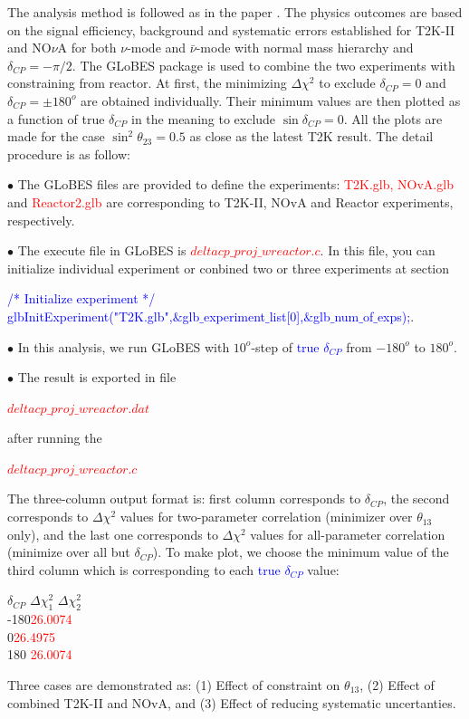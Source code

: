 \documentclass[a4 paper,12pt]{report}%
\begin{document}
The analysis method is followed as in the paper \cite{Abe:2014tzr}. The physics outcomes are based on the signal efficiency, background and systematic errors established for T2K-II \cite{Abe:2016tez} and NO$\nu$A \cite{Adamson:2017gxd} for both $\nu$-mode and $\bar{\nu}$-mode with normal mass hierarchy and $\delta_{CP} = - \pi/2$. The GLoBES package is used to combine the two experiments with constraining from reactor. At first, the minimizing $\Delta \chi^2$ to exclude $\delta_{CP} = 0$ and $\delta_{CP} = \pm 180^{o}$ are obtained individually. Their minimum values are then plotted as a function of true $\delta_{CP}$ in the meaning to exclude $\sin\delta_{CP} = 0$. All the plots are made for the case $\sin^2\theta_{23} = 0.5$ as close as the latest T2K result. The detail procedure is as follow:\par
$\bullet$ The GLoBES files are provided to define the experiments: \textcolor{red}{T2K.glb, NOvA.glb} and \textcolor{red}{Reactor2.glb} are corresponding to T2K-II, NOvA and Reactor experiments, respectively.\par 
$\bullet$ The execute file in GLoBES is \textcolor{red}{$deltacp\_proj\_wreactor.c$}. In this file, you can initialize individual experiment or conbined two or three experiments at section\par 
\begin{center}

\textcolor{blue}{/* Initialize experiment */ \\
 glbInitExperiment("T2K.glb",$\&$glb$\_$experiment$\_$list[0],$\&$glb$\_$num$\_$of$\_$exps);}.
\end{center} \par
$\bullet$ In this analysis, we run GLoBES with $10^{o}$-step of \textcolor{blue}{true $\delta_{CP}$} from $-180^{o}$ to $180^{o}$.\par 
$\bullet$ The result is exported in file \begin{center}\textcolor{red}{$deltacp\_proj\_wreactor.dat$} \end{center} 
after running the \begin{center}\textcolor{red}{$deltacp\_proj\_wreactor.c$} \end{center} 
The three-column output format is: first column corresponds to $\delta_{CP}$, the second corresponds to $\Delta \chi^2$ values for two-parameter correlation (minimizer over $\theta_{13}$ only), and the last one corresponds to $\Delta \chi^2$ values for all-parameter correlation (minimize over all but $\delta_{CP}$). To make plot, we choose the minimum value of the third column which is corresponding to each \textcolor{blue}{true $\delta_{CP}$} value:
\begin{center} $\delta_{CP}$ \qquad $\Delta \chi^2_1$ \qquad $\Delta \chi^2_2$ \\
-180\qquad \textcolor{red}{26.0074}\\
0\qquad \textcolor{red}{26.4975}\\
180 \qquad \textcolor{red}{26.0074} \end{center} 
Three cases are demonstrated as: (1) Effect of constraint on $\theta_{13}$, (2) Effect of combined T2K-II and NOvA, and (3) Effect of reducing systematic uncertanties. 
\end{document}
